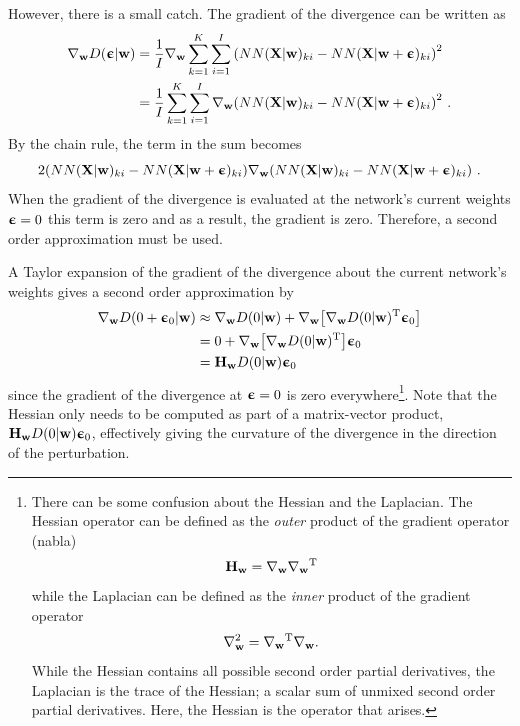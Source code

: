 However, there is a small catch. The gradient of the divergence can be written as
\begin{align}
    \nabla_{\mathbf{w}} D({\boldsymbol{\upepsilon}}|{\mathbf{w}})
    &=
    \frac{1}{I}\nabla_{\mathbf{w}}\sum_{k=1}^K\sum_{i=1}^I {\left(NN({\mathbf{X}}|{\mathbf{w}})_{ki} - NN({\mathbf{X}}|{\mathbf{w}}+{\boldsymbol{\upepsilon}})_{ki}\right)}^2\nonumber\\
    &=
    \frac{1}{I}\sum_{k=1}^K\sum_{i=1}^I \nabla_{\mathbf{w}}{\left(NN({\mathbf{X}}|{\mathbf{w}})_{ki} - NN({\mathbf{X}}|{\mathbf{w}}+{\boldsymbol{\upepsilon}})_{ki}\right)}^2\nonumber \ .
\end{align}
By the chain rule, the term in the sum becomes
\begin{equation}
    2{\left(NN({\mathbf{X}}|{\mathbf{w}})_{ki} - NN({\mathbf{X}}|{\mathbf{w}}+{\boldsymbol{\upepsilon}})_{ki}\right)}\nabla_{\mathbf{w}}{\left(NN({\mathbf{X}}|{\mathbf{w}})_{ki} - NN({\mathbf{X}}|{\mathbf{w}}+{\boldsymbol{\upepsilon}})_{ki}\right)} \ .
\end{equation}
When the gradient of the divergence is evaluated at the network's current weights ${\boldsymbol{\upepsilon}}=0$ this term is zero and as a result, the gradient is zero. Therefore, a second order approximation must be used.

A Taylor expansion of the gradient of the divergence about the current network's weights gives a second order approximation by
\begin{align}
    \nabla_{\mathbf{w}} D(0+{\boldsymbol{\upepsilon}}_0|{\mathbf{w}})
    &\approx \nabla_{\mathbf{w}} D(0|{\mathbf{w}}) + \nabla_{\mathbf{w}} {\left[ \nabla_{\mathbf{w}} D(0|{\mathbf{w}}){^\mathrm{T}}{\boldsymbol{\upepsilon}}_0\right]} \nonumber\\
    &= 0 + \nabla_{\mathbf{w}} {\left[\nabla_{\mathbf{w}} D(0|{\mathbf{w}}){^\mathrm{T}}\right]}{\boldsymbol{\upepsilon}}_0 \nonumber\\
    &= {\mathbf{H}}_{\mathbf{w}} D(0|{\mathbf{w}}) {\boldsymbol{\upepsilon}}_0
\end{align}
since the gradient of the divergence at ${\boldsymbol{\upepsilon}}=0$ is zero everywhere\footnote{\label{footnote: Discussion on Hessian versus vector Laplacian}There can be some confusion about the Hessian and the Laplacian. The Hessian operator can be defined as the \textit{outer} product of the gradient operator (nabla) $${\mathbf{H}}_{\mathbf{w}}=\nabla_{\mathbf{w}}\nabla_{\mathbf{w}}{^\mathrm{T}}$$ while the Laplacian can be defined as the \textit{inner} product of the gradient operator $$\nabla^2_{\mathbf{w}}=\nabla_{\mathbf{w}}{^\mathrm{T}}\nabla_{\mathbf{w}}.$$ While the Hessian contains all possible second order partial derivatives, the Laplacian is the trace of the Hessian; a scalar sum of unmixed second order partial derivatives. Here, the Hessian is the operator that arises.}.
Note that the Hessian only needs to be computed as part of a matrix-vector product, ${\mathbf{H}}_{\mathbf{w}} D(0|{\mathbf{w}}) {\boldsymbol{\upepsilon}}_0$, effectively giving the curvature of the divergence in the direction of the perturbation.

